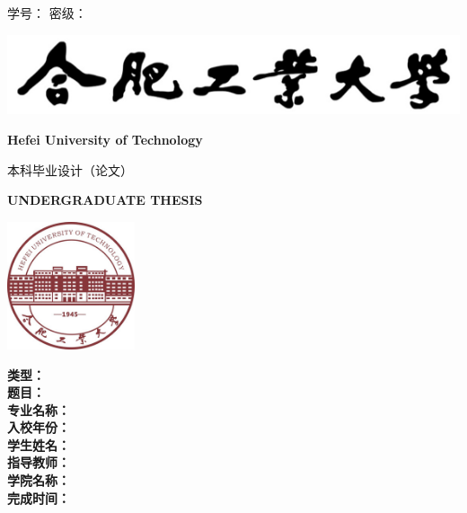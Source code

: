 \begin{titlepage}
{\heiti 学\hspace{1.5em}号：\underlineFixlen[3.5cm]{\studentID} \hfill
	{\heiti 密\hspace{1.5em}级：\underlineFixlen[3.5cm]{\privacy}}}

\centering
{\vspace{1.7cm} \includegraphics{images/hfut_name.png}\vspace{0.3cm}}

{\LARGE \bfseries Hefei University of Technology}\vspace{1cm}

{\chuhao \heiti 本科毕业设计（论文）}\vspace{0.7cm}

{\LARGE \bfseries UNDERGRADUATE THESIS}\vspace{0.9cm}

{\includegraphics[width=3.76cm, height=3.76cm]{images/hfut_logo.jpg}\vspace{1.3cm}}

{
\linespread{1.6}
\songti \sanhao
	{\bfseries 类\hspace{2em}型：}\underlineFixlen[8.8cm]{\type}\\
	{\bfseries 题\hspace{2em}目：}\underlineFixlen[8.8cm]{\titleCn}\\
	{\bfseries 专业名称：}\underlineFixlen[8.8cm]{\major}\\
	{\bfseries 入校年份：}\underlineFixlen[8.8cm]{\enrolmentYear}\\
	{\bfseries 学生姓名：}\underlineFixlen[8.8cm]{\studentNameCn}\\
	{\bfseries 指导教师：}\underlineFixlen[8.8cm]{\supervisor}\\
	{\bfseries 学院名称：}\underlineFixlen[8.8cm]{\department}\\
	{\bfseries 完成时间：}\\
}


\end{titlepage}
